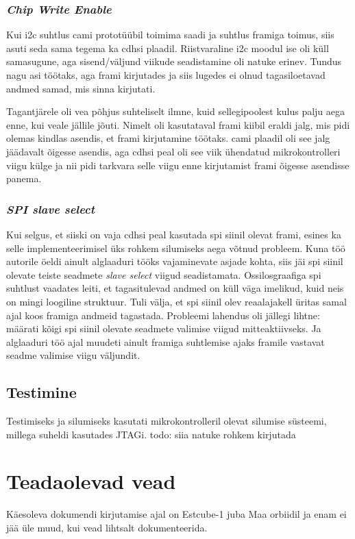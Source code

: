 \documentclass[12pt,a4paper]{article}
\begin{document}
\subsubsection{\textit{Chip Write Enable}}
Kui \gls{i2c} suhtlus \gls{cam}i prototüübil toimima saadi ja suhtlus \gls{fram}iga toimus, siis
asuti seda sama tegema ka \gls{cdhs}i plaadil. Riistvaraline \gls{i2c} moodul ise oli küll
samasugune, aga sisend/väljund viikude seadistamine oli natuke erinev. Tundus
nagu asi töötaks, aga \gls{fram}i kirjutades ja siis lugedes ei olnud tagasiloetavad
andmed samad, mis sinna kirjutati.

Tagantjärele oli vea põhjus suhteliselt ilmne, kuid sellegipoolest kulus palju
aega enne, kui veale jällile jõuti. Nimelt oli kasutataval \gls{fram}i kiibil eraldi
jalg, mis pidi olemas kindlas asendis, et \gls{fram}i kirjutamine töötaks. \gls{cam}i
plaadil oli see jalg jäädavalt õigesse asendis, aga \gls{cdhs}i peal oli see viik
ühendatud mikrokontrolleri viigu külge ja nii pidi tarkvara selle viigu enne
kirjutamist \gls{fram}i õigesse asendisse panema.

\subsubsection{\textit{SPI slave select}}
Kui selgus, et siiski on vaja \gls{cdhs}i peal kasutada \gls{spi} siinil olevat \gls{fram}i,
esines ka selle implementeerimisel üks rohkem silumiseks aega võtnud probleem.
Kuna töö autorile öeldi ainult alglaaduri tööks vajaminevate asjade kohta, siis
jäi \gls{spi} siinil olevate teiste seadmete \textit{slave select} viigud
seadistamata. Ossilosgraafiga \gls{spi} suhtlust vaadates leiti, et tagasitulevad
andmed on küll väga imelikud, kuid neis on mingi loogiline struktuur. Tuli
välja, et \gls{spi} siinil olev reaalajakell üritas samal ajal koos \gls{fram}iga andmeid
tagastada. Probleemi lahendus oli jällegi lihtne: määrati kõigi \gls{spi} siinil
olevate seadmete valimise viigud mitteaktiivseks. Ja alglaaduri töö ajal muudeti
ainult \gls{fram}iga suhtlemise ajaks \gls{fram}ile vastavat seadme valimise viigu väljundit.

\subsection{Testimine}
Testimiseks ja silumiseks kasutati mikrokontrolleril olevat silumise süsteemi,
millega suheldi kasutades JTAGi\cite{jtag}.
todo: siia natuke rohkem kirjutada
\section{Teadaolevad vead}
Käesoleva dokumendi kirjutamise ajal on Estcube-1 juba Maa orbiidil ja enam ei
jää üle muud, kui vead lihtsalt dokumenteerida.
\end{document}
